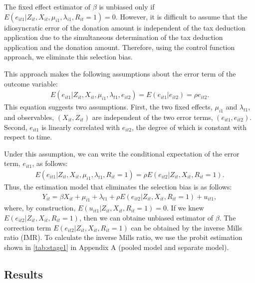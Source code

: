 \documentclass[
  11pt,
  a4paper,
]{article}
\begin{document}
The fixed effect estimator of \(\beta\) is unbiased only if
\(E(e_{it1} |Z_{it}, X_{it}, \mu_{i1}, \lambda_{i1}, R_{it} = 1) = 0\).
However, it is difficult to assume that
the idiosyncratic error of the donation amount
is independent of the tax deduction application
due to the simultaneous determination of
the tax deduction application and the donation amount.
Therefore, using the control function approach,
we eliminate this selection bias.

This approach makes the following assumptions
about the error term of the outcome variable:
\begin{align}
  E(e_{it1} | Z_{it}, X_{it}, \mu_{i1}, \lambda_{t1}, e_{it2})
  = E(e_{it1} | e_{it2}) = \rho e_{it2}.
\end{align}
This equation suggests two assumptions.
First, the two fixed effects, \(\mu_{i1}\) and \(\lambda_{t1}\),
and observables, \((X_{it}, Z_{it})\) are independent of
the two error terms, \((e_{it1}, e_{it2})\).
Second, \(e_{it1}\) is linearly correlated with \(e_{it2}\),
the degree of which is constant with respect to time.

Under this assumption,
we can write the conditional expectation of the error term, \(e_{it1}\),
as follows:
\begin{align}
  E(e_{it1} | Z_{it}, X_{it}, \mu_{i1}, \lambda_{t1}, R_{it} = 1)
  = \rho E(e_{it2} | Z_{it}, X_{it}, R_{it} = 1).
\end{align}
Thus, the estimation model that eliminates the selection bias is as follows:
\begin{align}
  Y_{it} = \beta  X_{it} + \mu_{i1} + \lambda_{t1}
  + \rho E(e_{it2} | Z_{it}, X_{it}, R_{it} = 1) + u_{it1},
\end{align}
where, by construction, \(E(u_{it1} | Z_{it}, X_{it}, R_{it} = 1) = 0\).
If we knew \(E(e_{it2} | Z_{it}, X_{it}, R_{it} = 1)\),
then we can obtaine unbiased estimator of \(\beta\).
The correction term \(E(e_{it2} | Z_{it}, X_{it}, R_{it} = 1)\)
can be obtained by the inverse Mills ratio (IMR).
To calculate the inverse Mills ratio, we use the probit estimation shown in
\ref{tab:stage1} in Appendix A (pooled model and separate model).

\hypertarget{results-1}{%
\subsection{Results}\label{results-1}}
\end{document}

